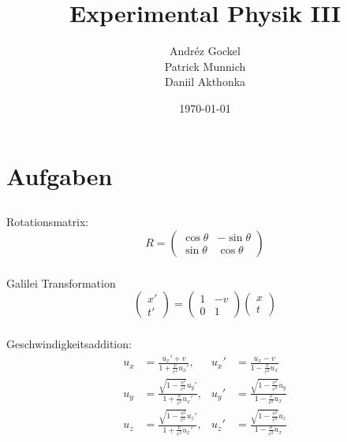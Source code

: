 \documentclass[12pt]{report}
\begin{document}
 
\title{Experimental Physik III}
\author{Andréz Gockel\\Patrick Munnich\\Daniil Akthonka}
 
\date{\today}
\maketitle

\chapter{Aufgaben}

\section{}

\subsection{}

Rotationsmatrix:
\[R=\begin{pmatrix}\cos\theta&-\sin\theta\\\sin\theta&\cos\theta\end{pmatrix}\]

\subsection{}

Galilei Transformation
\[\begin{pmatrix}x'\\t'\end{pmatrix}=\begin{pmatrix}1&-v\\0&1\end{pmatrix}\begin{pmatrix}x\\t\end{pmatrix}\]

\subsection{}

Geschwindigkeitsaddition:
\begin{align*}
u_x&=\frac{u_x'+v}{1+\frac{v}{c^2}u_x'},&u_x'&=\frac{u_x-v}{1-\frac{v}{c^2}u_x}\\
u_y&=\frac{\sqrt{1-\frac{v^2}{c^2}}u_y'}{1+\frac{v}{c^2}u_x'},&u_y'&=\frac{\sqrt{1-\frac{v^2}{c^2}}u_y}{1-\frac{v}{c^2}u_x}\\
u_z&=\frac{\sqrt{1-\frac{v^2}{c^2}}u_z'}{1+\frac{v}{c^2}u_x'},&u_z'&=\frac{\sqrt{1-\frac{v^2}{c^2}}u_z}{1-\frac{v}{c^2}u_x}
\end{align*}
\end{document}
